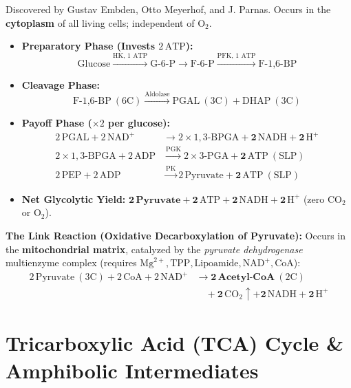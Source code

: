 \documentclass[10pt,twoside,openright]{book}
\begin{document}
\begin{formulabox}
Discovered by Gustav Embden, Otto Meyerhof, and J. Parnas. Occurs in the \textbf{cytoplasm} of all living cells; independent of $\mathrm{O}_2$.
\begin{itemize}[leftmargin=*]
  \item \textbf{Preparatory Phase (Invests $2\,\mathrm{ATP}$):}
  \[
    \text{Glucose} \xrightarrow{\text{HK, 1 ATP}} \text{G-6-P} \longrightarrow \text{F-6-P} \xrightarrow{\text{PFK, 1 ATP}} \text{F-1,6-BP}
  \]
  \item \textbf{Cleavage Phase:}
  \[
    \text{F-1,6-BP}\ (6\mathrm{C}) \xrightarrow{\text{Aldolase}} \text{PGAL}\ (3\mathrm{C}) + \text{DHAP}\ (3\mathrm{C})
  \]
  \item \textbf{Payoff Phase ($\times 2$ per glucose):}
  \begin{align*}
    2\,\text{PGAL} + 2\,\mathrm{NAD}^+ &\longrightarrow 2 \times 1,3\text{-BPGA} + \mathbf{2\,\mathrm{NADH} + 2\,\mathrm{H}^+} \\
    2 \times 1,3\text{-BPGA} + 2\,\mathrm{ADP} &\xrightarrow{\text{PGK}} 2 \times 3\text{-PGA} + \mathbf{2\,\mathrm{ATP}} \ (\text{SLP}) \\
    2\,\text{PEP} + 2\,\mathrm{ADP} &\xrightarrow{\text{PK}} 2\,\text{Pyruvate} + \mathbf{2\,\mathrm{ATP}} \ (\text{SLP})
  \end{align*}
  \item \textbf{Net Glycolytic Yield:} $\mathbf{2\,\text{Pyruvate}} + \mathbf{2\,\mathrm{ATP}} + \mathbf{2\,\mathrm{NADH} + 2\,\mathrm{H}^+}$ (zero $\mathrm{CO}_2$ or $\mathrm{O}_2$).
\end{itemize}

\textbf{The Link Reaction (Oxidative Decarboxylation of Pyruvate):}
Occurs in the \textbf{mitochondrial matrix}, catalyzed by the \textit{pyruvate dehydrogenase} multienzyme complex (requires $\mathrm{Mg}^{2+}, \text{TPP}, \text{Lipoamide}, \mathrm{NAD}^+, \text{CoA}$):
\begin{align*}
  2\,\text{Pyruvate}\ (3\mathrm{C}) + 2\,\mathrm{CoA} + 2\,\mathrm{NAD}^+ 
  &\longrightarrow \mathbf{2\,\text{Acetyl-CoA}}\ (2\mathrm{C}) \\
  &\quad + \mathbf{2\,\mathrm{CO_2}}\uparrow + \mathbf{2\,\mathrm{NADH} + 2\,\mathrm{H}^+}
\end{align*}
\end{formulabox}

\section{Tricarboxylic Acid (TCA) Cycle \& Amphibolic Intermediates}
\end{document}
